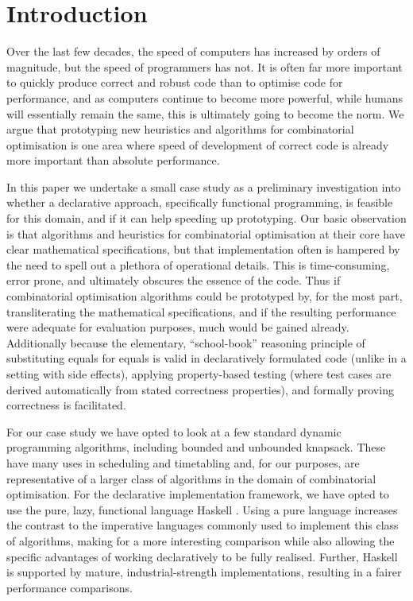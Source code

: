 \section{Introduction}

Over the last few decades, the speed of computers has increased by orders of
magnitude, but the speed of programmers has not. It is often far more
important to quickly produce correct and robust code than to optimise code for
performance, and as computers continue to become more powerful, while humans
will essentially remain the same, this is ultimately going to become the norm.
We argue that prototyping new heuristics and algorithms for combinatorial
optimisation is one area where speed of development of correct code is already
more important than absolute performance.

In this paper we undertake a small case study as a preliminary investigation
into whether a declarative approach, specifically functional programming, is
feasible for this domain, and if it can help speeding up prototyping. Our
basic observation is that algorithms and heuristics for combinatorial
optimisation at their core have clear mathematical specifications, but that
implementation often is hampered by the need to spell out a plethora of
operational details. This is time-consuming, error prone, and ultimately
obscures the essence of the code. Thus if combinatorial optimisation
algorithms could be prototyped by, for the most part, transliterating the
mathematical specifications, and if the resulting performance were adequate
for evaluation purposes, much would be gained already.
Additionally because the elementary, ``school-book'' reasoning principle of
substituting equals for equals is valid in declaratively formulated code
(unlike in a setting with side effects), applying property-based testing
\cite{quickcheck} (where test cases are derived automatically from stated
correctness properties), and formally proving correctness is facilitated.

For our case study we have opted to look at a few standard dynamic
programming algorithms, including bounded and unbounded knapsack. These have
many uses in scheduling and timetabling and, for our purposes, are
representative of a larger class of algorithms in the domain of combinatorial
optimisation. For the declarative implementation framework, we have opted to
use the pure, lazy, functional language Haskell \cite{Haskell98Book}. Using a
pure language increases the contrast to the imperative languages commonly used
to implement this class of algorithms, making for a more interesting
comparison while also allowing the specific advantages of working
declaratively
to be fully realised. Further, Haskell is supported by mature,
industrial-strength implementations, resulting in a fairer performance
comparisons.


